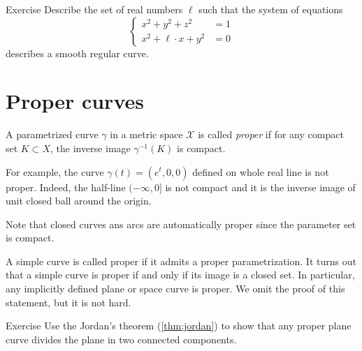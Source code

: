 \begin{thm}{Exercise}\label{ex:viviani}
Describe the set of real numbers $\ell$
such that the system of equations
\[\begin{cases}
x^2+y^2+z^2&=1
\\
x^2+\ell\cdot x+y^2&=0
\end{cases}\]
describes a smooth regular curve.
\end{thm}

\section*{Proper curves}

A parametrized curve $\gamma$ in a metric space $\mathcal{X}$ is called \emph{proper} if for any compact set $K \subset X$, the inverse image $\gamma^{-1}(K)$ is compact.

For example, the curve $\gamma(t)=(e^t,0,0)$ defined on whole real line is not proper.
Indeed, the half-line $(-\infty,0]$ is not compact and it is the inverse image of unit closed ball around the origin.  

Note that closed curves ans arcs are automatically proper since the parameter set is compact.

A simple curve is called proper if it admits a proper parametrization.
It turns out that a simple curve is proper if and only if its image is a closed set.
In particular, any implicitly defined plane or space curve is proper.
We omit the proof of this statement, but it is not hard. %

\begin{thm}{Exercise}\label{ex:proper-curve}
Use the Jordan's theorem (\ref{thm:jordan}) to show that any proper plane curve divides the plane in two connected components.  
\end{thm}




